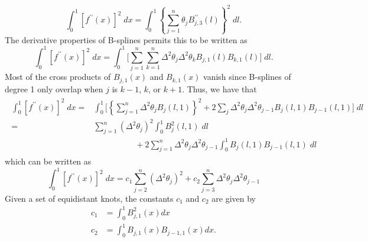 \documentclass[12pt]{article}
\theoremstyle{definition}
\begin{document}
\begin{equation*} 
\int_0^1 \left[ f^{\prime \prime}\left(x\right)\right]^2\;dx = \int_{0}^{1} \left\{ \sum\limits_{j=1}^n  \theta_j B_{j,3}^{\prime \prime} \left(l\right) \right\}^2\; dl.
\end{equation*}
\noindent
The derivative properties of B-splines permits this to be written as 
\begin{equation*} \label{eq:second-derivative-bspline-penalty}
\int_0^1 \left[ f^{\prime \prime}\left(x\right)\right]^2\;dx =  \int_{0}^{1}  \bigg[ \sum\limits_{j=1}^n \sum\limits_{k=1}^n \Delta^2 \theta_j \Delta^2 \theta_k B_{j,1}\left(l\right)B_{k,1}\left(l\right)\bigg]\; dl  . 
\end{equation*}
\noindent
Most of the cross products of $B_{j,1}\left(x\right)$ and $B_{k,1}\left( x \right)$ vanish since B-splines of degree 1 only overlap when $j$ is $k-1$, $k$, or $k+1$. Thus, we have that
\begin{align}
\begin{split}
\int_0^1 \left[ f^{\prime \prime}\left(x\right)\right]^2\;dx  = {} &  \int_0^1 \bigg[ \left\{ \sum\limits_{j=1}^n   \Delta^2 \theta_j  B_j\left(l,1\right)  \right\}^2  + 2 \sum_{j}\Delta^2 \theta_j\Delta^2 \theta_{j-1}B_j\left(l,1\right)B_{j-1}\left(l,1\right) \bigg]\; dl \\ 
= {} & \sum \limits_{j=1}^n  \left( \Delta^2\theta_j \right)^2 \int_0^1 B_j^2\left(l,1\right)\;dl \\
   &{} \;\;\;\;\;\;\;\;\;\;\;\;\;\;\;\;\;\; + 2 \sum\limits_{j=1}^n \Delta^2 \theta_j\Delta^2 \theta_{j-1} \int_0^1 B_j\left(l,1\right)B_{j-1}\left(l,1\right)\;dl 
\end{split}
\end{align}
\noindent
which can be written as
\begin{equation} \label{eq:derivative-penalty-difference-penalty-connection}
\int_0^1 \left[ f^{\prime \prime}\left(x\right)\right]^2\;dx  = c_1 \sum\limits_{j=2}^n \left( \Delta^2 \theta_j\right)^2 + c_2 \sum\limits_{j=3}^n \Delta^2 \theta_j\Delta^2 \theta_{j-1}
\end{equation}
\noindent
Given a set of equidistant knots, the constants $c_1$ and $c_2$ are given by
\begin{equation}
\begin{split}
c_1 & =   \int_0^1 B_{j,1}^2\left(x\right) dx\\
c_2 & = \int_0^1 B_{j,1}\left(x\right)B_{j-1,1}\left(x\right) dx.
\end{split}
\end{equation}
\end{document}
